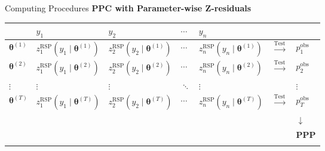 \documentclass[
  ignorenonframetext,
]{beamer}
\newcounter{none} %
\begin{document}
\begin{frame}{Computing Procedures}
\protect{}\label{computing-procedures}
\textbf{PPC with Parameter-wise Z-residuals}

{\def\LTcaptype{none} %
\begin{longtable}[]{@{}
  >{\raggedright\arraybackslash}p{}
  >{\raggedright\arraybackslash}p{}
  >{\raggedright\arraybackslash}p{}
  >{\raggedright\arraybackslash}p{}
  >{\raggedright\arraybackslash}p{}
  >{\raggedright\arraybackslash}p{}
  >{\raggedright\arraybackslash}p{}@{}}
\toprule\noalign{}
\begin{minipage}[b]{\linewidth}\raggedright
\end{minipage} & \begin{minipage}[b]{\linewidth}\raggedright
\(y_1\)
\end{minipage} & \begin{minipage}[b]{\linewidth}\raggedright
\(y_2\)
\end{minipage} & \begin{minipage}[b]{\linewidth}\raggedright
\(\cdots\)
\end{minipage} & \begin{minipage}[b]{\linewidth}\raggedright
\(y_n\)
\end{minipage} & \begin{minipage}[b]{\linewidth}\raggedright
\end{minipage} & \begin{minipage}[b]{\linewidth}\raggedright
\end{minipage} \\
\midrule\noalign{}
\endhead
\(\boldsymbol{\theta}^{(1)}\) &
\(z_1^{\text{RSP}}(y_1 \mid \boldsymbol{\theta}^{(1)})\) &
\(z_2^{\text{RSP}}(y_2 \mid \boldsymbol{\theta}^{(1)})\) & \(\cdots\) &
\(z_n^{\text{RSP}}(y_n \mid \boldsymbol{\theta}^{(1)})\) &
\(\xrightarrow{\text{Test}}\) & \(p_1^{\text{obs}}\) \\
\(\boldsymbol{\theta}^{(2)}\) &
\(z_1^{\text{RSP}}(y_1 \mid \boldsymbol{\theta}^{(2)})\) &
\(z_2^{\text{RSP}}(y_2 \mid \boldsymbol{\theta}^{(2)})\) & \(\cdots\) &
\(z_n^{\text{RSP}}(y_n \mid \boldsymbol{\theta}^{(2)})\) &
\(\xrightarrow{\text{Test}}\) & \(p_2^{\text{obs}}\) \\
\(\vdots\) & \(\vdots\) & \(\vdots\) & \(\ddots\) & \(\vdots\) & &
\(\vdots\) \\
\(\boldsymbol{\theta}^{(T)}\) &
\(z_1^{\text{RSP}}(y_1 \mid \boldsymbol{\theta}^{(T)})\) &
\(z_2^{\text{RSP}}(y_2 \mid \boldsymbol{\theta}^{(T)})\) & \(\cdots\) &
\(z_n^{\text{RSP}}(y_n \mid \boldsymbol{\theta}^{(T)})\) &
\(\xrightarrow{\text{Test}}\) & \(p_T^{\text{obs}}\) \\
& & & & & & \(\downarrow\) \\
& & & & & & \textbf{PPP} \\
\bottomrule\noalign{}
\end{longtable}
}


\end{frame}
\end{document}
